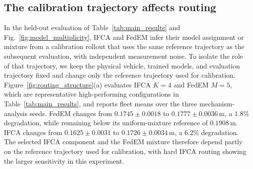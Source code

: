 \subsection{The calibration trajectory affects routing}
%
In the held-out evaluation of Table~\ref{tab:main_results} and Fig.~\ref{fig:model_multiplicity}, IFCA and FedEM infer their model assignment or mixture from a calibration rollout that uses the same reference trajectory as the subsequent evaluation, with independent measurement noise.
To isolate the role of that trajectory, we keep the physical vehicle, trained models, and evaluation trajectory fixed and change only the reference trajectory used for calibration.
Figure~\ref{fig:routing_structure}(a) evaluates IFCA $K=4$ and FedEM $M=5$, which are representative high-performing configurations in Table~\ref{tab:main_results}, and reports fleet means over the three mechanism-analysis seeds.
FedEM changes from $0.1745\pm0.0018$ to $0.1777\pm0.0036\,\mathrm{m}$, a $1.8\%$ degradation, while remaining below its uniform-mixture reference of $0.1908\,\mathrm{m}$.
IFCA changes from $0.1625\pm0.0031$ to $0.1726\pm0.0034\,\mathrm{m}$, a $6.2\%$ degradation.
The selected IFCA component and the FedEM mixture therefore depend partly on the reference trajectory used for calibration, with hard IFCA routing showing the larger sensitivity in this experiment.

